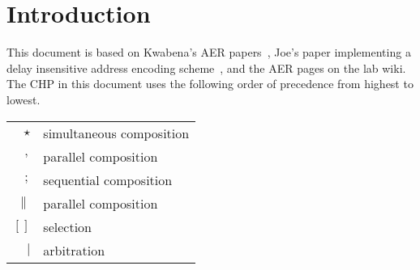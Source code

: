 \documentclass[aer.tex]{subfiles}
\begin{document}
\section{Introduction}

This document is based on Kwabena's AER papers~\cite{AER_I_Transmitter,AER_II_Receiver,AER_III_Analysis}, 
Joe's paper implementing a delay insensitive address encoding scheme~\cite{DI_AER},
and the AER pages on the lab wiki. 
The CHP in this document uses the following order of precedence from highest to lowest.

\begin{center}
  \begin{tabular}[]{rl}
    $\star$ & simultaneous composition \\
    $,$ & parallel composition \\
    $;$ & sequential composition \\
    $\|$ & parallel composition \\
    $[\!]$ & selection \\ 
    $\mathtt{\vert}$ & arbitration \\
  \end{tabular}
\end{center}

% 
% 
\end{document}

